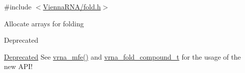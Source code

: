 {\ttfamily \#include $<$\hyperlink{fold_8h}{Vienna\-R\-N\-A/fold.\-h}$>$}

Allocate arrays for folding\par
\begin{DoxyRefDesc}{Deprecated}
\item[\hyperlink{deprecated__deprecated000075}{Deprecated}]See \hyperlink{group__mfe__fold_gabd3b147371ccf25c577f88bbbaf159fd}{vrna\-\_\-mfe()} and \hyperlink{group__fold__compound_ga1b0cef17fd40466cef5968eaeeff6166}{vrna\-\_\-fold\-\_\-compound\-\_\-t} for the usage of the new A\-P\-I!\end{DoxyRefDesc}
